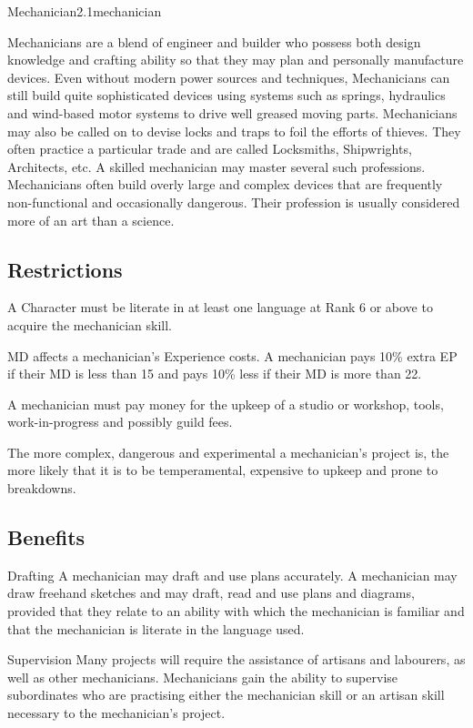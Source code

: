 \begin{skill}{Mechanician}{2.1}{mechanician}

Mechanicians are a blend of engineer and builder who possess both
design knowledge and crafting ability so that they may plan and
personally manufacture devices. Even without modern power sources and
techniques, Mechanicians can still build quite sophisticated devices
using systems such as springs, hydraulics and wind-based motor systems
to drive well greased moving parts. Mechanicians may also be called on
to devise locks and traps to foil the efforts of thieves. They often
practice a particular trade and are called Locksmiths, Shipwrights,
Architects, etc. A skilled mechanician may master several such
professions. Mechanicians often build overly large and complex devices
that are frequently non-functional and occasionally dangerous. Their
profession is usually considered more of an art than a science.

\subsection{Restrictions}

A Character must be literate in at least one language at Rank 6 or
above to acquire the mechanician skill.

MD affects a mechanician's Experience costs. A mechanician pays 10\%
extra EP if their MD is less than 15 and pays 10\% less if their MD is
more than 22.

A mechanician must pay money for the upkeep of a studio or workshop,
tools, work-in-progress and possibly guild fees.

The more complex, dangerous and experimental a mechanician's project
is, the more likely that it is to be temperamental, expensive to
upkeep and prone to breakdowns.

\subsection{Benefits}

\begin{Description}
\item[Drafting]
A mechanician may draft and use plans accurately.  A mechanician may
draw freehand sketches and may draft, read and use plans and diagrams,
provided that they relate to an ability with which the mechanician is
familiar and that the mechanician is literate in the language used.

\item[Supervision]
Many projects will require the assistance of artisans and labourers,
as well as other mechanicians. Mechanicians gain the ability to
supervise subordinates who are practising either the mechanician skill
or an artisan skill necessary to the mechanician's project.


\end{Description}
\end{skill}
